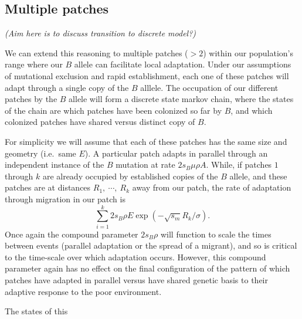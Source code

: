 \documentclass{article}
\newcommand{\plr}[1]{{\it\color{blue}(#1)}}
\begin{document}
\subsection{Multiple patches}

\plr{Aim here is to discuss transition to discrete model?}

We can extend this reasoning to multiple patches ($>2$) within our population's range
where our $B$ allele can facilitate local adaptation. Under our
assumptions of mutational exclusion and rapid establishment, each one
of these patches will adapt through a single copy of the $B$
alllele. The occupation of our different patches by the $B$ allele will form a
discrete state markov chain, where the states of the chain are which patches have
been colonized so far by $B$, and which colonized patches have shared
versus distinct copy of $B$.

For simplicity we will assume that each of these patches has
the same size and geometry (i.e.\ same $E$). A particular patch adapts in parallel through an independent
instance of the $B$ mutation at rate $2 s_B \mu \rho A$.
While, if patches $1$ through $k$ are already occupied by
established copies of the $B$ allele, and these patches are at
distances $R_1,~\cdots,~R_k$ away from our patch, the rate of
adaptation through migration in our patch is 
\begin{equation}
\sum_{i=1}^{k} 2 s_B \rho E \exp(- \sqrt{s_m} R_k/\sigma).
\end{equation}
Once again the compound parameter $2s_B \rho$ will function to
scale the times between events (parallel adaptation or the spread of a
migrant), and so is critical to the time-scale over which
adaptation occurs. However, this compound parameter again has no effect on
the final configuration of the pattern of which patches have adapted
in parallel versus have shared genetic basis to their adaptive
response to the poor environment.

The states of this 

\end{document}
